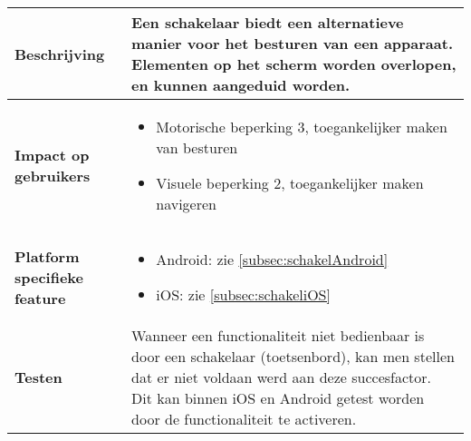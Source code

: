 \begin{table}[H]
\begin{tabular}{|l|p{12cm}|}
        \hline
        \textbf{Beschrijving}                 & Een schakelaar biedt een alternatieve manier voor het besturen van een apparaat. Elementen op het scherm worden overlopen, en kunnen aangeduid worden.\\ 
        \hline
        \textbf{Impact op gebruikers}         &  
        \begin{itemize}
            \item Motorische beperking 3, toegankelijker maken van besturen
                   \item Visuele beperking 2, toegankelijker maken navigeren
        \end{itemize}                                                                                                                                                                                                                                                                                                                                                                                                                    \\ 
        \hline
        \textbf{Platform specifieke feature}  & \begin{itemize}
            \item Android: zie \ref{subsec:schakelAndroid}
            \item iOS: zie \ref{subsec:schakeliOS}
        \end{itemize}                                                                                                                                                                                                                                                                                                                                   \\ 
        \hline
        \textbf{Testen}                       & Wanneer een functionaliteit niet bedienbaar is door een schakelaar (toetsenbord), kan men stellen dat er niet voldaan werd aan deze succesfactor. Dit kan binnen iOS en Android getest worden door de functionaliteit te activeren.                                                                                                                                                                                                                                                                     \\
        \hline
    \end{tabular}
\end{table}
\newpage
